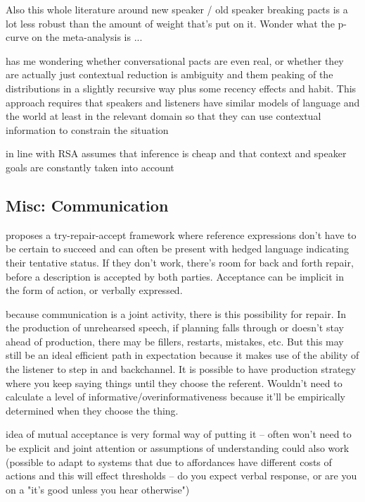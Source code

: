 \documentclass[]{article}
\begin{document}
 Also this whole literature around new speaker / old speaker breaking pacts is a lot less robust than the amount of weight that's put on it. Wonder what the p-curve on the meta-analysis is ... 
 
 \cite{piantadosi2012} has me wondering whether conversational pacts are even real, or whether they are actually just contextual reduction is ambiguity and them peaking of the distributions in a slightly recursive way plus some recency effects and habit. This approach requires that speakers and listeners have similar models of language and the world at least in the relevant domain so that they can use contextual information to constrain the situation 
 
 \cite{piantadosi2012} in line with RSA assumes that inference is cheap and that context and speaker goals are constantly taken into account 

\subsection{Misc: Communication}

\cite{clark1986} proposes a try-repair-accept framework where reference expressions don't have to be certain to succeed and can often be present with hedged language indicating their tentative status. If they don't work, there's room for back and forth repair, before a description is accepted by both parties. Acceptance can be implicit in the form of action, or verbally expressed. 

\cite{clark1986} because communication is a joint activity, there is this possibility for repair. In the production of unrehearsed speech, if planning falls through or doesn't stay ahead of production, there may be fillers, restarts, mistakes, etc. But this may still be an ideal efficient path in expectation because it makes use of the ability of the listener to step in and backchannel. It is possible to have production strategy where you keep saying things until they choose the referent. Wouldn't need to calculate a level of informative/overinformativeness because it'll be empirically determined when they choose the thing. 

\cite{clark1986} idea of mutual acceptance is very formal way of putting it -- often won't need to be explicit and joint attention or assumptions of understanding could also work (possible to adapt to systems that due to affordances have different costs of actions and this will effect thresholds -- do you expect verbal response, or are you on a "it's good unless you hear otherwise") 
\end{document}
